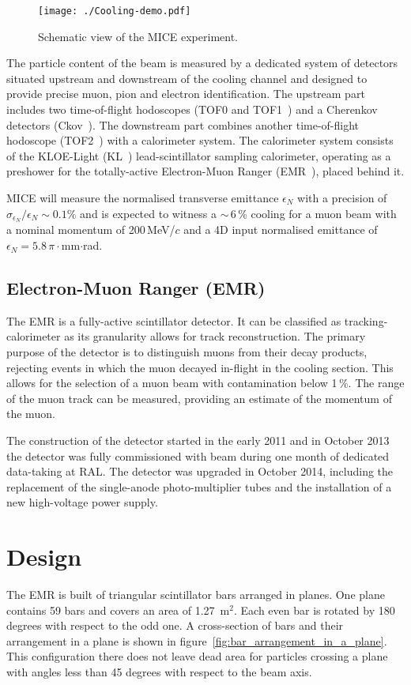 \documentclass[a4paper,11pt]{article}
\begin{document}
\begin{figure}[h]
 \texttt{[image: ./Cooling-demo.pdf]}
 \caption{Schematic view of the MICE experiment.}
 \label{fig:mice}
\end{figure}

The particle content of the beam is measured by a dedicated system of detectors situated upstream and downstream of the
cooling channel and designed to provide precise muon, pion and electron identification. The upstream part includes two
time-of-flight hodoscopes (TOF0 and TOF1~\cite{TOFref}) and a Cherenkov detectors (Ckov~\cite{MICE_PID}). The downstream part combines another 
time-of-flight hodoscope (TOF2~\cite{Bertoni:tof2}) with a calorimeter system. The calorimeter system consists of the KLOE-Light (KL~\cite{MICE_PID})
lead-scintillator sampling calorimeter, operating
as a preshower for the totally-active Electron-Muon Ranger (EMR~\cite{ruslan}), placed behind it.

MICE will measure the normalised transverse emittance $\epsilon_N$ with a precision of 
$\sigma_{\epsilon_N}/\epsilon_N \sim 0.1 \%$ and is expected to witness a $\sim\,$6\,\% cooling for a muon beam with a nominal momentum
of 200\,MeV/$c$ and a 4D input normalised emittance of $\epsilon_N = 5.8$\,$\pi\cdot$mm$\cdot$rad.

\subsection{Electron-Muon Ranger (EMR)}
The EMR is a fully-active scintillator detector. It can be classified as tracking-calorimeter as its granularity allows for track
reconstruction. The primary purpose of the detector is to distinguish muons from their decay products, rejecting events in which
the muon decayed in-flight in the cooling section.  This allows for the selection of a muon beam with contamination
below 1\,\%. The range of the muon track can be measured, providing an estimate of the momentum of the muon. 

The construction of the detector started in the early 2011 and in October 2013 the detector was fully commissioned with beam
during one month of dedicated data-taking at RAL. The detector was upgraded in October 2014, including the replacement of the single-anode
photo-multiplier tubes and the installation of a new high-voltage power supply.

\section{Design}
The EMR is built of triangular scintillator bars arranged in planes. 
One plane contains 59 bars and covers an area of 1.27~m$^2$. Each even bar is rotated by 180 degrees with respect to the odd one.
A cross-section of bars and their arrangement in a plane is shown in figure~\ref{fig:bar_arrangement_in_a_plane}. This
configuration there does not leave dead area for particles crossing a plane with angles less than 45 degrees with respect to the beam axis.
\end{document}
